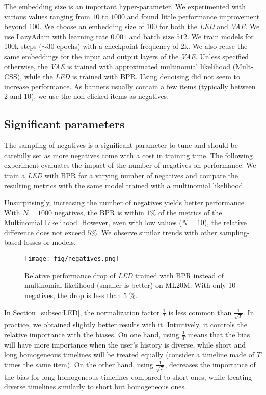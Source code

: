 \documentclass[sigconf]{acmart}
\begin{document}
The embedding size is an important hyper-parameter. We experimented with various values ranging from $10$ to $1000$ and found little performance improvement beyond $100$. We choose an embedding size of $100$ for both the \emph{LED} and \emph{VAE}. We use LazyAdam with learning rate $ 0.001 $ and batch size $ 512 $. We train models for 100k steps ($ \sim 30 $ epochs) with a checkpoint frequency of 2k. We also reuse the same embeddings for the input and output layers of the \emph{VAE}. Unless specified otherwise, the \emph{VAE} is trained with approximated multinomial likelihood (Mult-CSS), while the \emph{LED} is trained with BPR. Using denoising did not seem to increase performance. As banners usually contain a few items (typically between 2 and 10), we use the non-clicked items as negatives. 

\subsection{Significant parameters}

The sampling of negatives is a significant parameter to tune and should be carefully set as more negatives come with a cost in training time. The following experiment evaluates the impact of the number of negatives on performance. We train a \emph{LED} with BPR for a varying number of negatives and compare the resulting metrics with the same model trained with a multinomial likelihood. 

Unsurprisingly, increasing the number of negatives yields better performance. With $ N = 1000 $ negatives, the BPR is within $ 1\% $ of the metrics of the Multinomial Likelihood. However, even with low values ($ N = 10 $), the relative difference does not exceed $ 5\% $. We observe similar trends with other sampling-based losses or models.

\begin{figure}[h!]
    \centering
    \texttt{[image: fig/negatives.png]}
    \caption{Relative performance drop of \emph{LED} trained with BPR instead of multinomial likelihood (smaller is better) on ML20M. With only 10 negatives, the drop is less than 5 \%.}
    \label{fig:num-negatives}
\end{figure}

In Section~\ref{subsec:LED}, the normalization factor $ \frac{1}{T} $ is less common than $ \frac{1}{\sqrt{T}} $. In practice, we obtained slightly better results with it. Intuitively, it controls the relative importance with the biases. On one hand, using $ \frac{1}{T} $ means that the bias will have more importance when the user's history is diverse, while short and long homogeneous timelines will be treated equally (consider a timeline made of $ T $ times the same item). On the other hand, using $ \frac{1}{\sqrt{T}} $, decreases the importance of the bias for long homogeneous timelines compared to short ones, while treating diverse timelines similarly to short but homogeneous ones.
\end{document}
